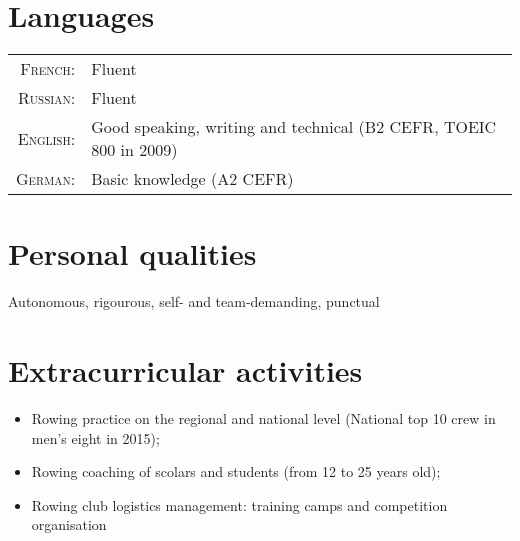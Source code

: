 \documentclass[letter,10pt]{article} %
\begin{document}
\section{Languages}

\begin{tabular}{rl}
\textsc{French:} & Fluent \\
\textsc{Russian:} & Fluent \\
\textsc{English:} & Good speaking, writing and technical (B2 CEFR, TOEIC 800
in 2009)\\
\textsc{German:} & Basic knowledge (A2 CEFR)\\
\end{tabular}


\section{Personal qualities}

Autonomous, rigourous, self- and team-demanding, punctual

\section{Extracurricular activities}

\begin{itemize}
\item Rowing practice on the regional and national level (National top 10 crew
in men's eight in 2015);
\item Rowing coaching of scolars and students (from 12 to 25 years old);
\item Rowing club logistics management: training camps and competition
organisation 
\end{itemize}

\end{document}
